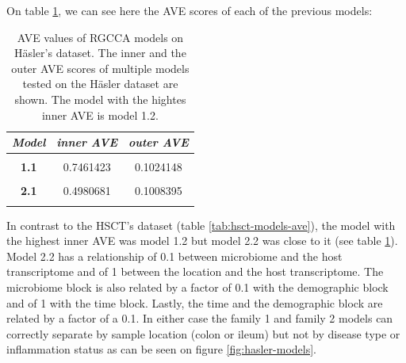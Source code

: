\documentclass[
  12pt,
  a4paper,
  twoside,
  openright]{book}
\begin{document}
On table \ref{tab:hasler-aves}, we can see here the AVE scores of each of the previous models:

\begin{table}[H]

\caption[AVE values of RGCCA models on Häsler's dataset]{\label{tab:hasler-aves}AVE values of RGCCA models on Häsler's dataset. The inner and the outer AVE scores of multiple models tested on the Häsler dataset are shown. The model with the hightes inner AVE is model 1.2.}
\centering
\begin{tabular}[t]{|>{}c|c|>{}c|}
\hline
\em{\textbf{Model}} & \em{\textbf{inner AVE}} & \em{\textbf{outer AVE}}\\
\hline
\textbf{\cellcolor{gray!6}{0}} & \cellcolor{gray!6}{0.8217371} & \cellcolor{gray!6}{0.0961236}\\
\hline
\textbf{1.1} & 0.7461423 & 0.1024148\\
\hline
\textbf{\cellcolor{gray!6}{1.2}} & \cellcolor{gray!6}{0.8349410} & \cellcolor{gray!6}{0.1025486}\\
\hline
\textbf{2.1} & 0.4980681 & 0.1008395\\
\hline
\textbf{\cellcolor{gray!6}{2.2}} & \cellcolor{gray!6}{0.7513065} & \cellcolor{gray!6}{0.1009915}\\
\hline
\end{tabular}
\end{table}

In contrast to the HSCT's dataset (table \ref{tab:hsct-models-ave}), the model with the highest inner AVE was model 1.2 but model 2.2 was close to it (see table \ref{tab:hasler-aves}).
Model 2.2 has a relationship of 0.1 between microbiome and the host transcriptome and of 1 between the location and the host transcriptome.
The microbiome block is also related by a factor of 0.1 with the demographic block and of 1 with the time block.
Lastly, the time and the demographic block are related by a factor of a 0.1.
In either case the family 1 and family 2 models can correctly separate by sample location (colon or ileum) but not by disease type or inflammation status as can be seen on figure \ref{fig:hasler-models}.
\end{document}
